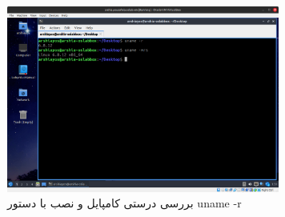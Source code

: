 \documentclass[12pt]{article}
\begin{document}
    \begin{figure}[H]
		\centering
		\includegraphics[width=0.8\textwidth]{report1-resources/56.png}
		\caption{بررسی درستی کامپایل و نصب با دستور \textenglish{uname -r}}
	\end{figure}
	
	\newpage
	\begin{LTR}
		\begin{english}
\printbibliography[title={مراجع}]
\end{english}
	\end{LTR}

	
\end{document}
